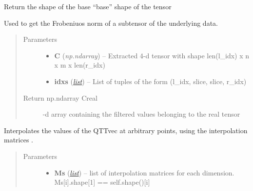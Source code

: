 \documentclass[a4paper,10pt,english]{sphinxmanual}
\begin{document}
\begin{fulllineitems}

\begin{fulllineitems}
\label{api-qttvec:TensorToolbox.core.QTTvec.get_q_shape}
Return the shape of the base ``base'' shape of the tensor

\end{fulllineitems}


\begin{fulllineitems}
\label{api-qttvec:TensorToolbox.core.QTTvec.get_ttdmrg_real_subtensor}
Used to get the Frobeniuos norm of a subtensor of the underlying data.
\begin{quote}\begin{description}
\item[{Parameters}] \leavevmode\begin{itemize}
\item {} 
\textbf{C} (\emph{np.ndarray}) -- Extracted 4-d tensor with shape len(l\_idx) x n x m x len(r\_idx)

\item {} 
\textbf{idxs} (\href{http://docs.python.org/library/functions.html\#list}{\emph{list}}) -- List of tuples of the form (l\_idx, slice, slice, r\_idx)

\end{itemize}

\item[{Return np.ndarray Creal}] -d array containing the filtered values belonging to the real tensor

\end{description}\end{quote}

\end{fulllineitems}


\begin{fulllineitems}
\label{api-qttvec:TensorToolbox.core.QTTvec.interpolate}
Interpolates the values of the QTTvec at arbitrary points, using the interpolation matrices .
\begin{quote}\begin{description}
\item[{Parameters}] \leavevmode\begin{itemize}
\item {} 
\textbf{Ms} (\href{http://docs.python.org/library/functions.html\#list}{\emph{list}}) -- list of interpolation matrices for each dimension. Ms{[}i{]}.shape{[}1{]} == self.shape(){[}i{]}


\end{itemize}
\end{description}
\end{quote}
\end{fulllineitems}
\end{fulllineitems}
\end{document}
